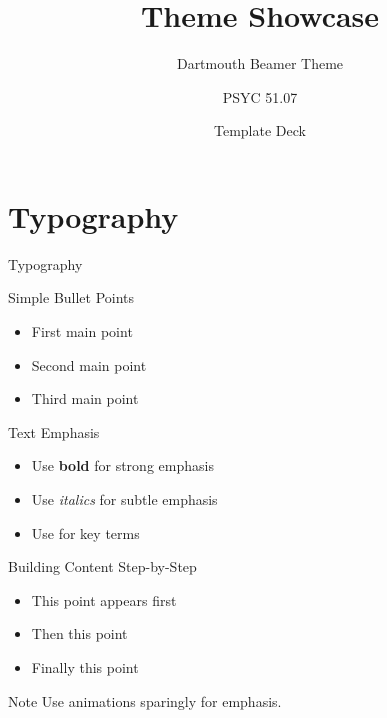 \documentclass[aspectratio=169]{beamer}
\title{Theme Showcase}
\subtitle{Dartmouth Beamer Theme}
\author{PSYC 51.07}
\institute{Dr. Jeremy R. Manning}
\date{Template Deck}
\begin{document}
\begin{frame}
\titlepage
\end{frame}

\section{Typography}

\begin{frame}[standout]
\centering
\Huge Typography
\end{frame}

\begin{frame}{Simple Bullet Points}
\begin{itemize}
    \item First main point
    \item Second main point
    \item Third main point
\end{itemize}
\end{frame}

\begin{frame}{Text Emphasis}
\begin{itemize}
    \item Use \textbf{bold} for strong emphasis
    \item Use \emph{italics} for subtle emphasis
    \item Use  for key terms
\end{itemize}
\end{frame}

\begin{frame}{Building Content Step-by-Step}
\begin{itemize}[<+->]
    \item This point appears first
    \item Then this point
    \item Finally this point
\end{itemize}

\begin{block}{Note}
Use animations sparingly for emphasis.
\end{block}
\end{frame}
\end{document}
